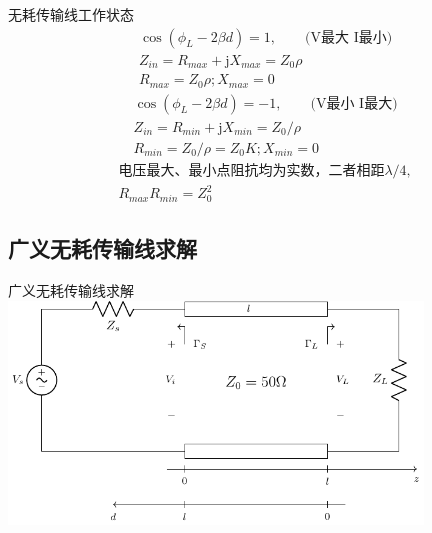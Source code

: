 \begin{frame}{无耗传输线工作状态}
  \begin{align*}
     & \cos(\phi_L-2\beta d)=1,\qquad \text{(V最大 I最小)} \\
     & Z_{in}=R_{max}+\mathrm{j}X_{max}=Z_0\rho        \\
     & R_{max}=Z_0\rho;X_{max}=0
  \end{align*}
  \hspace*{\fill}
  \begin{align*}
     & \cos(\phi_L-2\beta d)=-1,\qquad \text{(V最小 I最大)} \\
     & Z_{in}=R_{min}+\mathrm{j}X_{min}=Z_0/\rho        \\
     & R_{min}=Z_0/\rho=Z_0K;X_{min}=0
  \end{align*}
  \hspace*{\fill}
  \begin{align*}
     & \text{电压最大、最小点阻抗均为实数，二者相距}\lambda/4, \\
     & R_{max}R_{min}=Z_{0}^{2}
  \end{align*}
\end{frame}

\subsection{广义无耗传输线求解}


\begin{frame}{广义无耗传输线求解}
  \centering
  \includegraphics[width=11cm]{Cha3//fig3-16.pdf}
\end{frame}


